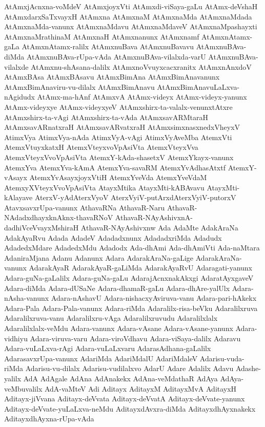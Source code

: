 {AtAmxjAcnxna-voMdeV
AtAmxjoyxVti
AtAmxdi-viSaya-gaLu
AtAmx-deVshaH
AtAmxdarxSaTxvayxH
AtAmxna
AtAmxnaM
AtAmxnaMda
AtAmxnaMdada
AtAmxnaMda-vanunx
AtAmxnaMdavu
AtAmxnaMdaveV
AtAmxnaMpashayxti
AtAmxnaMrathinaM
AtAmxnaH
AtAmxnanunx
AtAmxnamf
AtAmxnAtamx-gaLa
AtAmxnAtamx-ralilx
AtAmxnuBava
AtAmxnuBavavu
AtAmxnuBAva-diMda
AtAmxnuBAva-rUpa-vAda
AtAmxnuBAva-vilalxda-varU
AtAmxnuBAva-vilalxde
AtAmxnu-shAsana-dalilx
AtAmxnoVvuyxcacxranitx
AtAmxnAnxdoV
AtAmxBAsa
AtAmxBAsavu
AtAmxBimAna
AtAmxBimAnavanunx
AtAmxBimAnaviru-vu-dilalx
AtAmxBimAnavu
AtAmxBimAnavuLaLxva-nAgidudx
AtAmx-ma-hAnf
AtAmxvA
AtAmx-videyx
AtAmx-videyx-yanunx
AtAmx-videyxye
AtAmx-videyxyeV
AtAmxshirx-ta-valalx-venunxtAtxre
AtAmxshirx-ta-vAgi
AtAmxshirx-ta-vAda
AtAmxsavARMtaraH
AtAmxsavARnatxraH
AtAmxsavARvatxraH
AtAmxsimxnasxnedxVheyxV
AtimxVya
AtimxVya-nAda
AtimxVyA-vAgi
AtimxVyAveMba
AtemxVti
AtemxVtuyxkatxH
AtemxVteyxvoVpAsiVta
AtemxVteyxVva
AtemxVteyxVvoVpAsiVta
AtemxY-kAda-shasetxV
AtemxYkayx-vanunx
AtemxYva
AtemxYva-kAmA
AtemxYva-savaRM
AtemxYvAdhasAtxtf
AtemxY-vAsayx
AtemxYvAsayxjoyxVtiH
AtemxYveVda
AtemxYveVdaM
AtemxyXVteyxVvoVpAsiVta
AtayxMtika
AtayxMti-kABAvavu
AtayxMti-kAlayave
AterxV-yAdAterxVyoV
AterxVyiV-putArxdAterxVyiV-putorxV
AtavxsavxrUpa-vanunx
AthavaRNa
AthavaR-Naru
AthavaR-NAdadxdhayxknAknx-thavaRNoV
AthavaR-NAyAshivxnA-dadhiVceVvayxMshiraH
AthavaR-NAyAshivxnw
Ada
AdaMte
AdakAraNa
AdakAyaRvu
Adada
AdadeV
Adadadxnunx
AdadadxriMda
Adadudx
AdadedxMdare
AdadedxMdu
Adadodx
Ada-dhAmi
Ada-dhAmiVti
Ada-naMtara
AdaniraMjana
Adanu
Adanunx
Adara
AdarakAraNa-gaLige
AdarakAraNa-vanunx
AdarakAyaR
AdarakAyaR-gaLiMda
AdarakAyaRvU
Adaragati-yanunx
Adara-guNa-gaLalilx
Adara-guNa-gaLu
AdarajAcnxnakAkxgi
AdaratAyxgaveV
Adara-diMda
Adara-dUSaNe
Adara-dhamaR-gaLu
Adara-dhAre-yalUlx
Adara-nAsha-vanunx
Adara-nAshavU
Adara-nishacxyAviruva-vanu
Adara-pari-hAkekx
Adara-Pala
Adara-Pala-vanunx
Adara-riMda
Adaralilx-risa-beVku
Adaralilxruva
Adaralilxruva-vanu
Adaralilxru-vAga
Adaralilxruvudu
Adaralilxlalx
Adaralilxlalx-veMdu
Adara-vanunx
Adara-vAsane
Adara-vAsane-yanunx
Adara-vidhiyu
Adara-viruva-varu
Adara-viroVdhavu
Adara-viSaya-dalilx
Adaravu
Adara-vuLaLxva-rAgi
Adara-vuLaLxvaru
AdarasAdhana-gaLalilx
AdarasavxrUpa-vanunx
AdariMda
AdariMdalU
AdariMdaleV
Adarisu-vuda-riMda
Adarisu-vu-dilalx
Adarisu-vudilalxvo
AdarU
Adare
Adalilx
Adavu
Adashe-yalilx
AdA
AdAgale
AdAna
AdAnakekx
AdAna-veMdathaR
AdAya
AdAya-veMbuvalilx
AdA-vaMteV
Adi
Aditayx
AditayxM
AditayxMvA
AditayxH
Aditayx-jiVvana
Aditayx-deVvata
Aditayx-deVvatA
Aditayx-deVvate-yanunx
Aditayx-deVvate-yuLaLxva-neMdu
AditayxdAvxra-diMda
AditayxdhAyxnakekx
AditayxdhAyxna-rUpa-vAda
}
